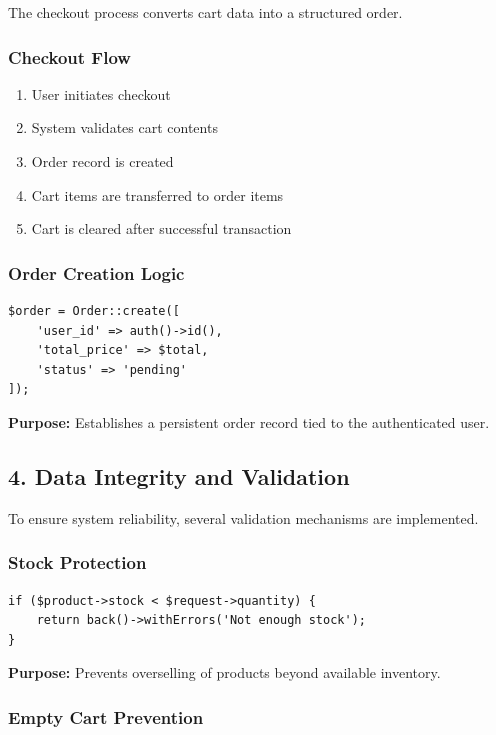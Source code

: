 \documentclass[12pt,a4paper]{article}
\begin{document}
The checkout process converts cart data into a structured order.

\subsubsection{Checkout Flow}

\begin{enumerate}[noitemsep]
    \item User initiates checkout
    \item System validates cart contents
    \item Order record is created
    \item Cart items are transferred to order items
    \item Cart is cleared after successful transaction
\end{enumerate}

\subsubsection{Order Creation Logic}

\begin{verbatim}
$order = Order::create([
    'user_id' => auth()->id(),
    'total_price' => $total,
    'status' => 'pending'
]);
\end{verbatim}

\textbf{Purpose:} Establishes a persistent order record tied to the authenticated user.

\subsection{4. Data Integrity and Validation}

To ensure system reliability, several validation mechanisms are implemented.

\subsubsection{Stock Protection}

\begin{verbatim}
if ($product->stock < $request->quantity) {
    return back()->withErrors('Not enough stock');
}
\end{verbatim}

\textbf{Purpose:} Prevents overselling of products beyond available inventory.

\subsubsection{Empty Cart Prevention}
\end{document}
